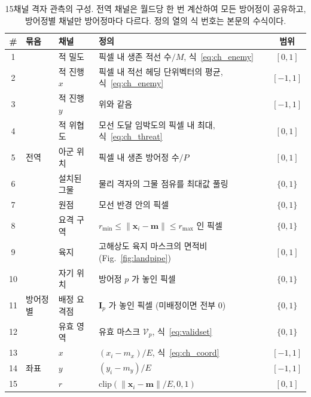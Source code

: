 \begin{table}[tp]
\centering
\caption{15채널 격자 관측의 구성. 전역 채널은 월드당 한 번 계산하여 모든 방어정이 공유하고,
         방어정별 채널만 방어정마다 다르다. 정의 열의 식 번호는 본문의 수식이다.}
\label{tab:channels}
\footnotesize
\renewcommand{\arraystretch}{1.15}
\begin{tabular}{@{}clllc@{}}
\toprule
\# & 묶음 & 채널 & 정의 & 범위 \\
\midrule
1  & \multirow{9}{*}{전역}   & 적 밀도        & 픽셀 내 생존 적선 수$/M$, 식~\eqref{eq:ch_enemy}      & $[0,1]$ \\
2  &                         & 적 진행 $x$    & 픽셀 내 적선 헤딩 단위벡터의 평균, 식~\eqref{eq:ch_enemy} & $[-1,1]$ \\
3  &                         & 적 진행 $y$    & 위와 같음                                              & $[-1,1]$ \\
4  &                         & 적 위협도      & 모선 도달 임박도의 픽셀 내 최대, 식~\eqref{eq:ch_threat} & $[0,1]$ \\
5  &                         & 아군 위치      & 픽셀 내 생존 방어정 수$/P$                             & $[0,1]$ \\
6  &                         & 설치된 그물    & 물리 격자의 그물 점유를 최대값 풀링                     & $\{0,1\}$ \\
7  &                         & 원점           & 모선 반경 안의 픽셀                                    & $\{0,1\}$ \\
8  &                         & 요격 구역      & $r_{\min} \le \lVert \mathbf{x}_i - \mathbf{m} \rVert \le r_{\max}$ 인 픽셀 & $\{0,1\}$ \\
9  &                         & 육지           & 고해상도 육지 마스크의 면적비 (Fig.~\ref{fig:landpipe}) & $[0,1]$ \\
\midrule
10 & \multirow{3}{*}{방어정별} & 자기 위치     & 방어정 $p$ 가 놓인 픽셀                                & $\{0,1\}$ \\
11 &                         & 배정 요격점    & $\mathbf{I}_p$ 가 놓인 픽셀 (미배정이면 전부 0)        & $\{0,1\}$ \\
12 &                         & 유효 영역      & 유효 마스크 $\mathcal{V}_p$, 식~\eqref{eq:validset}    & $\{0,1\}$ \\
\midrule
13 & \multirow{3}{*}{좌표}   & $x$            & $(x_i - m_x)/E$, 식~\eqref{eq:ch_coord}                & $[-1,1]$ \\
14 &                         & $y$            & $(y_i - m_y)/E$                                        & $[-1,1]$ \\
15 &                         & $r$            & $\mathrm{clip}(\lVert \mathbf{x}_i - \mathbf{m} \rVert / E, 0, 1)$ & $[0,1]$ \\
\bottomrule
\end{tabular}
\end{table}

